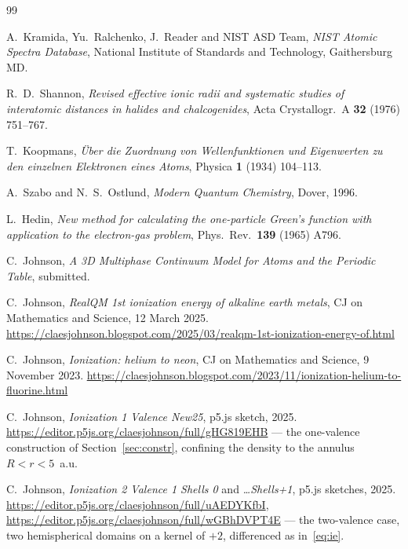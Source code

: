 \documentclass[11pt]{article}
\begin{document}
\begin{thebibliography}{99}

 A.~Kramida, Yu.~Ralchenko, J.~Reader and NIST ASD Team, \emph{NIST Atomic
Spectra Database}, National Institute of Standards and Technology, Gaithersburg MD.

 R.~D.~Shannon, \emph{Revised effective ionic radii and systematic
studies of interatomic distances in halides and chalcogenides}, Acta Crystallogr.\ A
\textbf{32} (1976) 751--767.

 T.~Koopmans, \emph{\"Uber die Zuordnung von Wellenfunktionen und
Eigenwerten zu den einzelnen Elektronen eines Atoms}, Physica \textbf{1} (1934) 104--113.

 A.~Szabo and N.~S.~Ostlund, \emph{Modern Quantum Chemistry},
Dover, 1996.

 L.~Hedin, \emph{New method for calculating the one-particle Green's function
with application to the electron-gas problem}, Phys.\ Rev.\ \textbf{139} (1965) A796.

 C.~Johnson, \emph{A 3D Multiphase Continuum Model for Atoms and the
Periodic Table}, submitted.

 C.~Johnson, \emph{RealQM 1st ionization energy of alkaline earth
metals}, CJ on Mathematics and Science, 12 March 2025.
\url{https://claesjohnson.blogspot.com/2025/03/realqm-1st-ionization-energy-of.html}

 C.~Johnson, \emph{Ionization: helium to neon}, CJ on Mathematics and
Science, 9 November 2023.
\url{https://claesjohnson.blogspot.com/2023/11/ionization-helium-to-fluorine.html}

 C.~Johnson, \emph{Ionization 1 Valence New25}, p5.js sketch, 2025.
\url{https://editor.p5js.org/claesjohnson/full/gHG819EHB} --- the one-valence construction
of Section~\ref{sec:constr}, confining the density to the annulus $R<r<5$~a.u.

 C.~Johnson, \emph{Ionization 2 Valence 1 Shells 0} and
\emph{\ldots Shells+1}, p5.js sketches, 2025.
\url{https://editor.p5js.org/claesjohnson/full/uAEDYKfbI},
\url{https://editor.p5js.org/claesjohnson/full/wGBhDVPT4E} --- the two-valence case, two
hemispherical domains on a kernel of $+2$, differenced as in~\eqref{eq:ie}.

\end{thebibliography}
\end{document}
